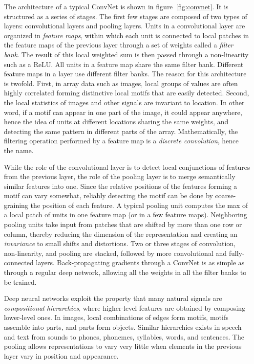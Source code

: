 \documentclass[10pts]{article}
\begin{document}
The architecture of a typical ConvNet is shown in
figure~\ref{fig:convnet}.  It is structured as a series of stages. The
first few stages are composed of two types of layers: convolutional
layers and pooling layers. Units in a convolutional layer are
organized in {\em feature maps}, within which each unit is connected
to local patches in the feature maps of the previous layer through a
set of weights called a {\em filter bank}. The result of this local
weighted sum is then passed through a non-linearity such as a ReLU.  All
units in a feature map share the same filter bank. Different feature
maps in a layer use different filter banks. The reason for this
architecture is twofold. First, in array data such as images, local
groups of values are often highly correlated forming distinctive local
motifs that are easily detected. Second, the local statistics of
images and other signals are invariant to location. In other word, if
a motif can appear in one part of the image, it could appear anywhere,
hence the idea of units at different locations sharing the same
weights, and detecting the same pattern in different parts of the
array.  Mathematically, the filtering operation performed by a feature
map is a {\em discrete convolution}, hence the name.

While the role of the convolutional layer is to detect local
conjunctions of features from the previous layer, the role of the
pooling layer is to merge semantically similar features into
one. Since the relative positions of the features forming a motif can
vary somewhat, reliably detecting the motif can be done by
coarse-graining the position of each feature. A typical pooling unit
computes the max of a local patch of units in one feature map (or in a
few feature maps). Neighboring pooling units take input from patches
that are shifted by more than one row or column, thereby reducing the
dimension of the representation and creating an {\em invariance} to
small shifts and distortions.  Two or three stages of convolution,
non-linearity, and pooling are stacked, followed by more convolutional
and fully-connected layers.  Back-propagating gradients through a
ConvNet is as simple as through a regular deep network, allowing all
the weights in all the filter banks to be trained. 

Deep neural networks exploit the property that many natural
signals are {\em compositional hierarchies}, where higher-level
features are obtained by composing lower-level ones. In images, local
combinations of edges form motifs, motifs assemble into parts, and
parts form objects.  Similar hierarchies
exists in speech and text from sounds to phones, phonemes, syllables,
words, and sentences. The pooling allows representations to vary very little
when elements in the previous layer vary in position and appearance. 
\end{document}
